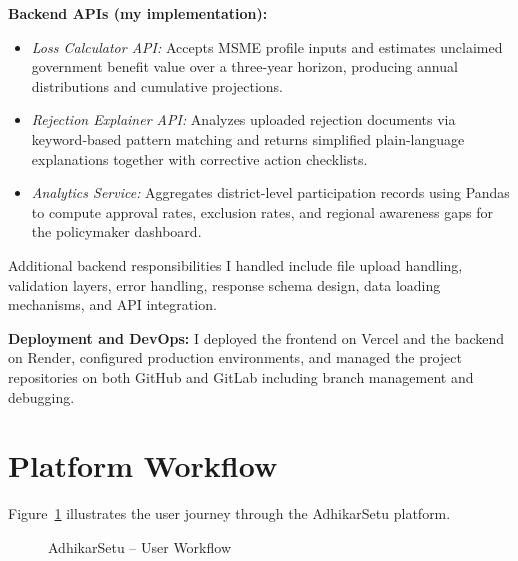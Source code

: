 \documentclass{book}
\begin{document}
\par\noindent \textbf{Backend APIs (my implementation):}
\begin{itemize}
  \item \textit{Loss Calculator API:} Accepts MSME profile inputs and estimates unclaimed government benefit value over a three-year horizon, producing annual distributions and cumulative projections.
  \item \textit{Rejection Explainer API:} Analyzes uploaded rejection documents via keyword-based pattern matching and returns simplified plain-language explanations together with corrective action checklists.
  \item \textit{Analytics Service:} Aggregates district-level participation records using Pandas to compute approval rates, exclusion rates, and regional awareness gaps for the policymaker dashboard.
\end{itemize}

\par\noindent Additional backend responsibilities I handled include file upload handling, validation layers, error handling, response schema design, data loading mechanisms, and API integration.

\par\noindent \textbf{Deployment and DevOps:} I deployed the frontend on Vercel and the backend on Render, configured production environments, and managed the project repositories on both GitHub and GitLab including branch management and debugging.

\section{Platform Workflow}

\par\noindent Figure~\ref{fig:adhi_flow} illustrates the user journey through the AdhikarSetu platform.

\begin{figure}[ht]
\centering
{}
\caption{AdhikarSetu -- User Workflow}
\label{fig:adhi_flow}
\end{figure}
\end{document}
